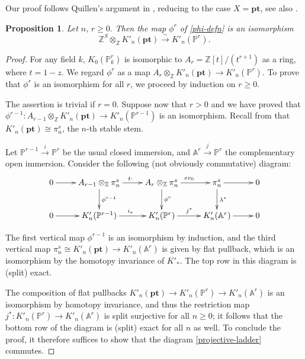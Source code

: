 \documentclass[12pt]{amsart}
\newcommand{\A}{\mathbb{A}}
\newcommand{\Z}{\mathbb{Z}}
\newcommand{\bbP}{\mathbb{P}}
\newcommand{\pt}{\mathbf{pt}}
\numberwithin{equation}{section}
\theoremstyle{plain}
\newtheorem{prop}[equation]{Proposition}
\theoremstyle{definition}
\theoremstyle{remark}
\begin{document}
Our proof follows Quillen's argument in \cite[Section 7, 4.3]{Quillen}, reducing to the case $X = \pt$, see also \cite[Prop.\,5.7]{HW}.

\begin{prop}\label{prop:proj-space}
	Let $n,\,r\geq 0.$ Then the map $\phi^r$ of \eqref{phi-defn} is an isomorphism
		\[\Z^{S}\otimes_\Z K'_n(\pt)\xrightarrow{\sim} K'_n(\bbP^r).\]		
\end{prop}

\begin{proof}
	For any field $k$, $K_0(\bbP^r_k)$ is isomorphic to $A_r = \Z[t]/(t^{r+1})$ as a ring, where $t = 1-z$. 
	We regard $\phi^r$ as a map $A_r\otimes_\Z K'_n(\pt)\to K'_n(\bbP^{r})$. 
	To prove that $\phi^r$ is an isomorphism for all $r$, we proceed by induction on $r\geq 0$. 
	
  The assertion is trivial if $r = 0$. Suppose now that $r > 0$ and we have proved that $\phi^{r-1}: A_{r-1}\otimes_\Z K'_n(\pt)\to K'_n(\bbP^{r-1})$ is an isomorphism. Recall from \cite{HW} that $K'_n(\pt) \cong \pi^s_n$, the $n$-th stable stem. 
  
  Let $\bbP^{r-1}\xrightarrow{i} \bbP^r$ be the usual closed immersion, and $\A^r\xrightarrow{j} \bbP^r$ the complementary open immersion. Consider the following (not obviously commutative) diagram:
	\begin{equation}\label{projective-ladder}
		\xymatrix{
			0  \ar[r]&
			A_{r-1}\otimes_\Z \pi^s_n \ar[d]^{\phi^{r-1}} \ar[r]^{t\cdot}& A_r\otimes_\Z \pi^s_n \ar[d]^{\phi^r} \ar[r]^{ev_0}& \pi^s_n \ar[d]^{\lambda^*} \ar[r]& 0
			\\
			0  \ar[r]&
			K'_n(\bbP^{r-1}) \ar[r]^{i_*}& K'_n(\bbP^r) \ar[r]^{j^*}& K'_n(\A^r) \ar[r]& 0
		}
	\end{equation}
	
	The first vertical map $\phi^{r-1}$ is an isomorphism by induction, and the third vertical map $\pi^s_n \cong K'_n(\pt)\to K'_n(\A^r)$ is given by flat pullback, which is an isomorphism by the homotopy invariance of $K'_\ast$. The top row in this diagram is (split) exact. 
	
	The composition of flat pullbacks $K'_n(\pt)\to K'_n(\bbP^r)\to K'_n(\A^r)$ is an isomorphism by homotopy invariance, and thus the restriction map $j^*:K'_n(\bbP^r)\to K'_n(\A^r)$ is split surjective for all $n\geq 0$; it follows that the bottom row of the diagram is (split) exact for all $n$ as well. To conclude the proof, it therefore suffices to show that the diagram \eqref{projective-ladder} commutes. 
	

\end{proof}
\end{document}
